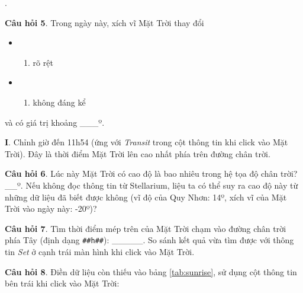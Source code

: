 \documentclass[
  a4paper,
]{book}
\providecommand{\tightlist}{%
  \setlength{\itemsep}{0pt}\setlength{\parskip}{0pt}}
\begin{document}
.

\textbf{Câu hỏi 5}. Trong ngày này, xích vĩ Mặt Trời thay đổi

\begin{itemize}
\tightlist
\item
  \begin{enumerate}
  \def\labelenumi{(\Alph{enumi})}
  \tightlist
  \item
    rõ rệt\\
  \end{enumerate}
\item
  \begin{enumerate}
  \def\labelenumi{(\Alph{enumi})}
  \setcounter{enumi}{1}
  \tightlist
  \item
    không đáng kể
  \end{enumerate}
\end{itemize}

và có giá trị khoảng \_\_\_º.

\textbf{I}. Chỉnh giờ đến 11h54 (ứng với \emph{Transit} trong cột thông tin khi click vào Mặt Trời). Đây là thời điểm Mặt Trời lên cao nhất phía trên đường chân trời.

\textbf{Câu hỏi 6}. Lúc này Mặt Trời có cao độ là bao nhiêu trong hệ tọa độ chân trời? \_\_º. Nếu không đọc thông tin từ Stellarium, liệu ta có thể suy ra cao độ này từ những dữ liệu đã biết được không (vĩ độ của Quy Nhơn: 14º, xích vĩ của Mặt Trời vào ngày này: -20º)?

\textbf{Câu hỏi 7}. Tìm thời điểm mép trên của Mặt Trời chạm vào đường chân trời phía Tây (định dạng \texttt{\#\#h\#\#}): \_\_\_\_\_. So sánh kết quả vừa tìm được với thông tin \emph{Set} ở cạnh trái màn hình khi click vào Mặt Trời.

\textbf{Câu hỏi 8}. Điền dữ liệu còn thiếu vào bảng \ref{tab:sunrise}, sử dụng cột thông tin bên trái khi click vào Mặt Trời:
\end{document}
